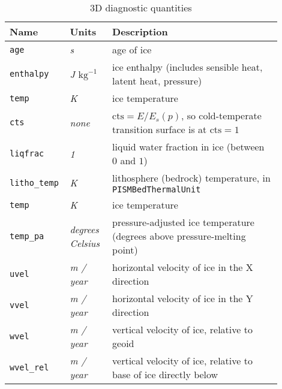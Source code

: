 \begin{table}[ht]
  \centering
  \begin{tabular}{p{0.15\linewidth}p{0.15\linewidth}p{0.6\linewidth}}
    \toprule
    \textbf{Name} & \textbf{Units} & \textbf{Description} \\
    \midrule
    \texttt{age} & \textsl{s} & age of ice \\
    \texttt{enthalpy} & \textsl{J $\mathrm{kg}^{-1}$} & ice enthalpy (includes sensible heat, latent heat, pressure) \\
    \texttt{temp} & \textsl{K} & ice temperature \\
    \texttt{cts} & \textsl{none} &  $\mathrm{cts} = E/E_s(p)$, so cold-temperate transition surface is at $\mathrm{cts} = 1$ \\
    \texttt{liqfrac} & \textsl{1} &  liquid water fraction in ice (between $0$ and $1$) \\
    \texttt{litho_temp} & \textsl{K} & lithosphere (bedrock) temperature, in \texttt{PISMBedThermalUnit} \\
    \texttt{temp} & \textsl{K} &  ice temperature \\
    \texttt{temp_pa} & \textsl{degrees Celsius} &  pressure-adjusted ice temperature (degrees above pressure-melting point) \\
    \texttt{uvel} & \textsl{m / year} &  horizontal velocity of ice in the X direction \\
    \texttt{vvel} & \textsl{m / year} &  horizontal velocity of ice in the Y direction \\
    \texttt{wvel} & \textsl{m / year} &  vertical velocity of ice, relative to geoid \\
    \texttt{wvel_rel} & \textsl{m / year} &  vertical velocity of ice, relative to base of ice directly below \\
    \bottomrule
  \end{tabular}
\caption{3D diagnostic quantities}
\label{tab:three-d-diagnostics}
\end{table}

